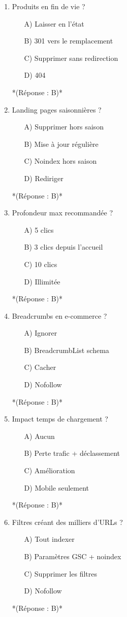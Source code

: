 \documentclass[12pt,a4paper,twoside]{report}
\begin{document}
\begin{enumerate}
\item Produits en fin de vie ?
\begin{itemize}
\item[A)] Laisser en l'état
\item[B)] 301 vers le remplacement
\item[C)] Supprimer sans redirection
\item[D)] 404
\end{itemize}
*(Réponse : B)*

\item Landing pages saisonnières ?
\begin{itemize}
\item[A)] Supprimer hors saison
\item[B)] Mise à jour régulière
\item[C)] Noindex hors saison
\item[D)] Rediriger
\end{itemize}
*(Réponse : B)*

\item Profondeur max recommandée ?
\begin{itemize}
\item[A)] 5 clics
\item[B)] 3 clics depuis l'accueil
\item[C)] 10 clics
\item[D)] Illimitée
\end{itemize}
*(Réponse : B)*

\item Breadcrumbs en e-commerce ?
\begin{itemize}
\item[A)] Ignorer
\item[B)] BreadcrumbList schema
\item[C)] Cacher
\item[D)] Nofollow
\end{itemize}
*(Réponse : B)*

\item Impact temps de chargement ?
\begin{itemize}
\item[A)] Aucun
\item[B)] Perte trafic + déclassement
\item[C)] Amélioration
\item[D)] Mobile seulement
\end{itemize}
*(Réponse : B)*

\item Filtres créant des milliers d'URLs ?
\begin{itemize}
\item[A)] Tout indexer
\item[B)] Paramètres GSC + noindex
\item[C)] Supprimer les filtres
\item[D)] Nofollow
\end{itemize}
*(Réponse : B)*


\end{enumerate}
\end{document}
